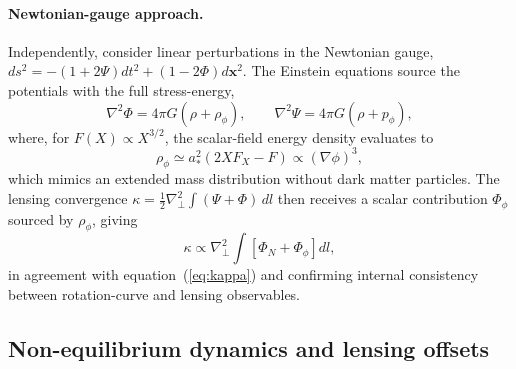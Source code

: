 \documentclass[11pt,a4paper]{article}
\begin{document}
\paragraph{Newtonian-gauge approach.}
Independently, consider linear perturbations in the Newtonian gauge,
$ds^2 = -(1+2\Psi)dt^2 + (1-2\Phi)d\mathbf{x}^2$.
The Einstein equations source the potentials with the full stress-energy,
\begin{equation}
  \nabla^2 \Phi = 4\pi G(\rho + \rho_\phi),
  \qquad
  \nabla^2 \Psi = 4\pi G(\rho + p_\phi),
\end{equation}
where, for $F(X)\propto X^{3/2}$, the scalar-field energy density evaluates to
\begin{equation}
  \rho_\phi \simeq a_*^2(2XF_X - F) \propto (\nabla\phi)^3,
\end{equation}
which mimics an extended mass distribution without dark matter particles.
The lensing convergence $\kappa = \tfrac{1}{2}\nabla_\perp^2\int(\Psi+\Phi)\,dl$
then receives a scalar contribution $\Phi_\phi$ sourced by $\rho_\phi$, giving
\begin{equation}
  \kappa \propto \nabla_\perp^2\int\!\left[\Phi_N + \Phi_\phi\right]dl,
\end{equation}
in agreement with equation~(\ref{eq:kappa}) and confirming internal consistency
between rotation-curve and lensing observables.

\subsection{Non-equilibrium dynamics and lensing offsets}
\label{subsec:nonequilibrium}
\end{document}

